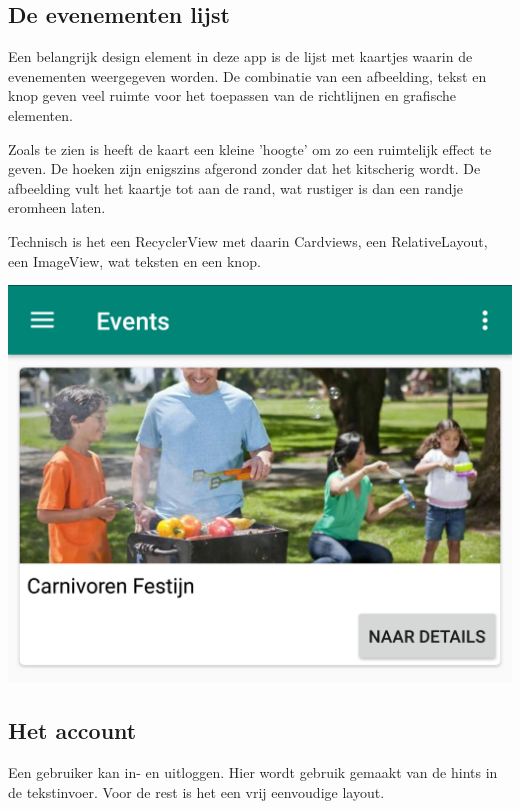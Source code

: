 \documentclass[dutch]{report}
\begin{document}
	
	\subsection{De evenementen lijst}
	\begin{minipage}{0.60\textwidth}
	Een belangrijk design element in deze app is de lijst met kaartjes waarin de evenementen weergegeven
	worden. De combinatie van een afbeelding, tekst en knop geven veel ruimte voor het toepassen van de 
	richtlijnen en grafische elementen. 
	
	Zoals te zien is heeft de kaart een kleine 'hoogte' om zo een ruimtelijk effect te geven. De hoeken 
	zijn enigszins afgerond zonder dat het kitscherig wordt. De afbeelding vult het kaartje tot aan de 
	rand, wat rustiger is dan een randje eromheen laten. 
	
	Technisch is het een RecyclerView met daarin Cardviews, een RelativeLayout, een ImageView, wat 
	teksten en een knop.
	
	\end{minipage}
	\hfill
	\begin{minipage}{0.35\textwidth}
	\includegraphics[width=\linewidth]{images/cardlist.png}
	\end{minipage}
	
	\subsection{Het account}
	Een gebruiker kan in- en uitloggen. Hier wordt gebruik gemaakt van de hints in de tekstinvoer. Voor 
	de rest is het een vrij eenvoudige layout. 
	
\end{document}

